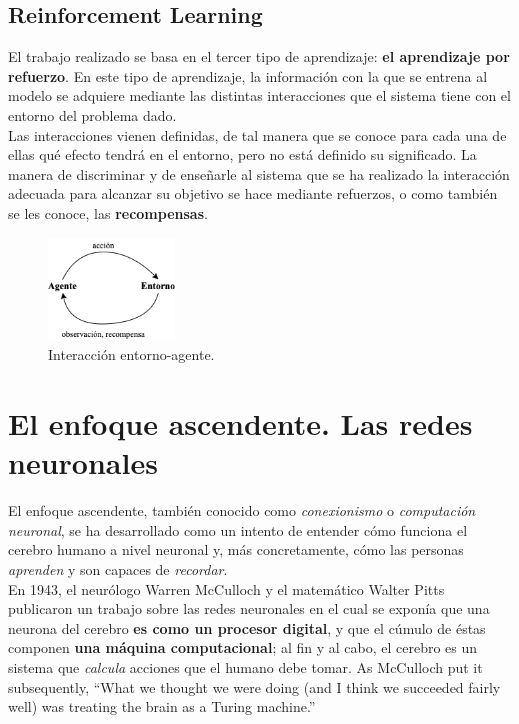 \subsection{Reinforcement Learning}

El trabajo realizado se basa en el tercer tipo de aprendizaje: \textbf{el aprendizaje por refuerzo}. En este tipo de aprendizaje, la información con la que se entrena al modelo se adquiere mediante las distintas interacciones que el sistema tiene con el entorno del problema dado. \\

Las interacciones vienen definidas, de tal manera que se conoce para cada una de ellas qué efecto tendrá en el entorno, pero no está definido su significado. La manera de discriminar y de enseñarle al sistema que se ha realizado la interacción adecuada para alcanzar su objetivo se hace mediante refuerzos, o como también se les conoce, las \textbf{recompensas}. 

\begin{figure}[h]
    \centering
    \includegraphics[width=0.3\textwidth]{cap2_contextualizacion/images/gym_ML.png}
    \caption{Interacción entorno-agente.}
    \label{fig:gym_ML}
\end{figure}


\section{El enfoque ascendente. Las redes neuronales}

El enfoque ascendente, también conocido como \textit{conexionismo} o \textit{computación neuronal}, se ha desarrollado como un intento de entender cómo funciona el cerebro humano a nivel neuronal y, más concretamente, cómo las personas \textit{aprenden} y son capaces de \textit{recordar}. \\

En 1943, el neurólogo Warren McCulloch y el matemático Walter Pitts publicaron un trabajo sobre las redes neuronales en el cual se exponía que una neurona del cerebro \textbf{es como un procesor digital}, y que el cúmulo de éstas componen \textbf{una máquina computacional}; al fin y al cabo, el cerebro es un sistema que \textit{calcula} acciones que el humano debe tomar. As McCulloch put it subsequently, “What we thought we were doing (and I think we succeeded fairly well) was treating the brain as a Turing machine.”

